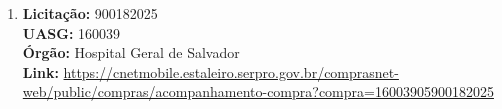 \begin{apendicesenv}
{\begin{enumerate}
    \item \textbf{Licitação:} 900182025 \\
          \textbf{UASG:} 160039 \\
          \textbf{Órgão:} Hospital Geral de Salvador \\
          \textbf{Link:} \url{https://cnetmobile.estaleiro.serpro.gov.br/comprasnet-web/public/compras/acompanhamento-compra?compra=16003905900182025}
\end{enumerate}
}

\vspace{2mm}

\end{apendicesenv}
